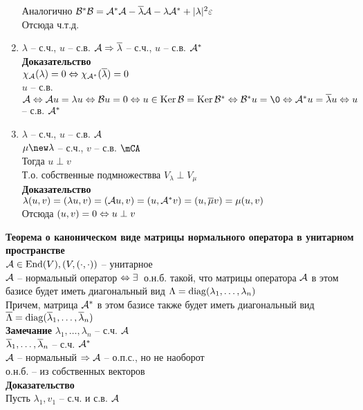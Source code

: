 \documentclass[12pt]{article}
\begin{document}
\begin{enumerate}
        Аналогично $\mathcal{B}^*\mathcal{B} = \mathcal{A}^*\mathcal{A} - \overline \lambda\mathcal{A} - \lambda\mathcal{A}^*  + | \lambda|^2\varepsilon $\\
        Отсюда ч.т.д.
    \item $ \lambda $ -- с.ч., $u$ -- с.в. $\mathcal{A} \Rightarrow \overline \lambda$ -- с.ч., $u$ -- с.в. $\mathcal{A}^*$\\
        \textbf{Доказательство}\\
        $\chi_\mathcal{A}( \lambda) = 0 \Leftrightarrow \chi_{\mathcal{A}^*}(\overline \lambda) = 0 $\\
        $u$ -- с.в. $\mcA \LRto \mcA u = \lambda u \LRto \mcB u = 0 \LRto u \in \ker \mcB = \ker \mcB^* \LRto \mcB^*u = \0 \LRto \mcA^* u = \ol \lambda u \LRto u$ -- с.в. $\mathcal{A}^*$
    \item $ \lambda$ -- с.ч., $u$ -- с.в. $\mathcal{A}$\\
        $ \mu \new \lambda$ -- с.ч., $v$ -- с.в. $\mCA$\\
        Тогда $u \perp v$\\
        Т.о. собственные подмножествва $V_ \lambda \perp V_ \mu$\\
        \textbf{Доказательство}\\
        $ \lambda(u, v) = ( \lambda u, v) = (\mathcal{A} u, v) = (u, \mathcal{A}^* v) = (u, \overline \mu v) = \mu(u, v)$\\
        Отсюда $(u, v) = 0 \Leftrightarrow u \perp v$
\end{enumerate}
\textbf{Теорема о каноническом виде матрицы нормального оператора в унитарном пространстве}\\
$\mathcal{A} \in \operatorname{End}(V), (V, (\cdot, \cdot))$ -- унитарное\\
$\mathcal{A}$ -- нормальный оператор $\Leftrightarrow \exists\,$ о.н.б. такой, что матрицы оператора $\mathcal{A}$ в этом базисе будет иметь диагональный вид $ \Lambda = \operatorname{diag}( \lambda_1, \ldots, \lambda_n)$\\
Причем, матрица $\mathcal{A}^*$ в этом базисе также будет иметь диагональный вид $\overline{ \Lambda} = \operatorname{diag}(\overline \lambda_1, \ldots, \overline \lambda_n)$\\
\textbf{Замечание}
$ \lambda_1, \ldots, \lambda_n$ -- с.ч. $\mathcal{A}$\\
$\overline \lambda_1, \ldots, \overline \lambda_n$ -- с.ч. $\mathcal{A}^*$\\
$\mathcal{A}$ -- нормальный $\Rightarrow \mathcal{A}$ -- о.п.с., но не наоборот\\
о.н.б. -- из собственных векторов\\
\textbf{Доказательство}\\
Пусть $ \lambda_1, v_1$ -- с.ч. и с.в. $\mathcal{A}$\\
\end{document}
